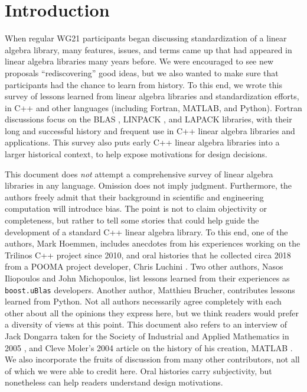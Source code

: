 \section{Introduction}
\label{S:intro}

When regular WG21 participants began discussing standardization of a
linear algebra library, many features, issues, and terms came up that
had appeared in linear algebra libraries many years before.  We were
encouraged to see new proposals ``rediscovering'' good ideas, but we
also wanted to make sure that participants had the chance to learn
from history.  To this end, we wrote this survey of lessons learned
from linear algebra libraries and standardization efforts, in C++ and
other languages (including Fortran, MATLAB, and Python).  Fortran
discussions focus on the BLAS \cite{BLAS-standard}, LINPACK
\cite{dongarra1979linpack}, and LAPACK \cite{LAPACK-Users-Guide}
libraries, with their long and successful history and frequent use in
C++ linear algebra libraries and applications.  This survey also puts
early C++ linear algebra libraries into a larger historical context,
to help expose motivations for design decisions.

This document does \emph{not} attempt a comprehensive survey of linear
algebra libraries in any language.  Omission does not imply judgment.
Furthermore, the authors freely admit that their background in
scientific and engineering computation will introduce bias.  The point
is not to claim objectivity or completeness, but rather to tell some
stories that could help guide the development of a standard C++ linear
algebra library.  To this end, one of the authors, Mark Hoemmen,
includes anecdotes from his experiences working on the Trilinos C++
project \cite{heroux2005trilinos} since 2010, and oral histories that
he collected circa 2018 from a POOMA project developer, Chris Luchini
\cite{hoemmen2018history}.  Two other authors, Nasos Iliopoulos and
John Michopoulos, list lessons learned from their experiences as
\texttt{boost.uBlas} developers.  Another author, Matthieu Brucher,
contributes lessons learned from Python.  Not all authors necessarily
agree completely with each other about all the opinions they express
here, but we think readers would prefer a diversity of views at this
point.  This document also refers to an interview of Jack Dongarra
taken for the Society of Industrial and Applied Mathematics in 2005
\cite{dongarra2005history}, and Cleve Moler's 2004 article on the
history of his creation, MATLAB \cite{moler2004origins}.  We also
incorporate the fruits of discussion from many other contributors, not
all of which we were able to credit here.  Oral histories carry
subjectivity, but nonetheless can help readers understand design
motivations.

